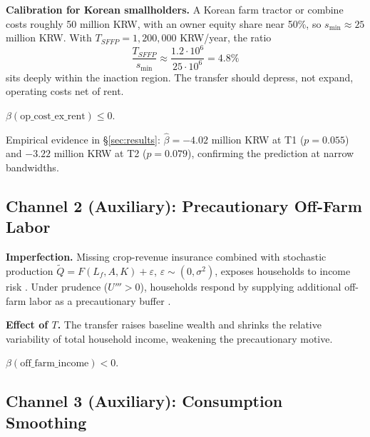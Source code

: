 \textbf{Calibration for Korean smallholders.} A Korean farm tractor or combine costs roughly 50 million KRW, with an owner equity share near 50\%, so $s_{\min} \approx 25$ million KRW. With $T_{SFFP} = 1{,}200{,}000$ KRW/year, the ratio
\begin{equation}
\frac{T_{SFFP}}{s_{\min}} \approx \frac{1.2 \cdot 10^6}{25 \cdot 10^6} = 4.8\%
\label{eq:ss-ratio}
\end{equation}
sits deeply within the inaction region. The transfer should depress, not expand, operating costs net of rent.

\begin{prediction}[Channel 1]
\label{pred:ch1}
$\beta(\text{op\_cost\_ex\_rent}) \le 0$.
\end{prediction}

Empirical evidence in \S\ref{sec:results}: $\hat\beta = -4.02$ million KRW at T1 ($p = 0.055$) and $-3.22$ million KRW at T2 ($p = 0.079$), confirming the prediction at narrow bandwidths.

\subsection{Channel 2 (Auxiliary): Precautionary Off-Farm Labor}
\label{sec:ch2-sandmo}

\textbf{Imperfection.} Missing crop-revenue insurance combined with stochastic production $\tilde Q = F(L_f, A, K) + \varepsilon$, $\varepsilon \sim (0, \sigma^2)$, exposes households to income risk \citep{Sandmo1971_uncertainty}. Under prudence ($U''' > 0$), households respond by supplying additional off-farm labor as a precautionary buffer \citep{Kimball1990_prudence}.

\textbf{Effect of $T$.} The transfer raises baseline wealth and shrinks the relative variability of total household income, weakening the precautionary motive.

\begin{prediction}[Channel 2]
\label{pred:ch2}
$\beta(\text{off\_farm\_income}) < 0$.
\end{prediction}

\subsection{Channel 3 (Auxiliary): Consumption Smoothing}
\label{sec:ch3-bp}

